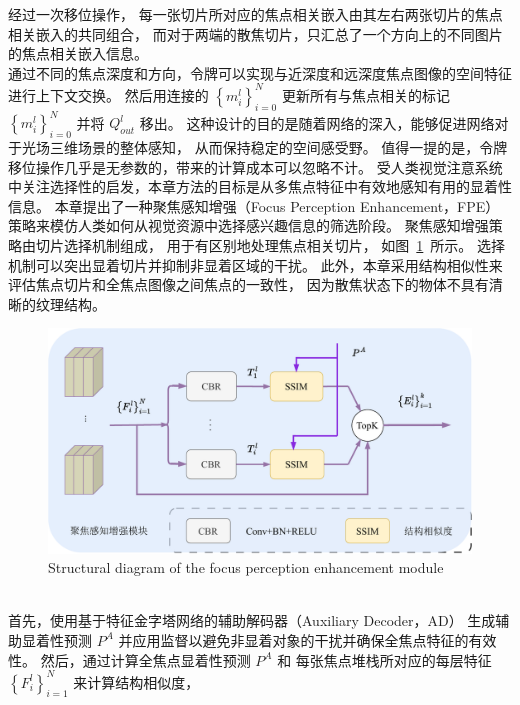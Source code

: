 经过一次移位操作，
每一张切片所对应的焦点相关嵌入由其左右两张切片的焦点相关嵌入的共同组合，
而对于两端的散焦切片，只汇总了一个方向上的不同图片的焦点相关嵌入信息。
\\
%
%
%
%
\indent
通过不同的焦点深度和方向，令牌可以实现与近深度和远深度焦点图像的空间特征进行上下文交换。 
然后用连接的 $ \left \{ m_{i}^{l} \right \}_{i=0}^{N} $ 更新所有与焦点相关的标记  $ \left \{ m_{i}^{l} \right \}_{i=0}^{N} $ 并将 
$ Q_{out}^{l} $ 移出。 
这种设计的目的是随着网络的深入，能够促进网络对于光场三维场景的整体感知，
从而保持稳定的空间感受野。 
值得一提的是，令牌移位操作几乎是无参数的，带来的计算成本可以忽略不计。
%
%
%
%
受人类视觉注意系统中关注选择性的启发，本章方法的目标是从多焦点特征中有效地感知有用的显着性信息。 
本章提出了一种聚焦感知增强（Focus Perception Enhancement，FPE）策略来模仿人类如何从视觉资源中选择感兴趣信息的筛选阶段。 
聚焦感知增强策略由切片选择机制组成，
用于有区别地处理焦点相关切片，
如图~\ref{cpt3_fig1:fpe}~所示。
选择机制可以突出显着切片并抑制非显着区域的干扰。 
此外，本章采用结构相似性来评估焦点切片和全焦点图像之间焦点的一致性，
因为散焦状态下的物体不具有清晰的纹理结构。 
%
%
\begin{figure}[!ht]
	\centering
	\includegraphics[width=0.90\linewidth]{figures/chapter3/fpe}
	{Structural diagram of the focus perception enhancement module}
	\label{cpt3_fig1:fpe}
\end{figure}
%
%
\\
%
%
%
%
\indent
首先，使用基于特征金字塔网络的辅助解码器（Auxiliary Decoder，AD）
生成辅助显着性预测 $ P^{A} $ 并应用监督以避免非显着对象的干扰并确保全焦点特征的有效性。 
然后，通过计算全焦点显着性预测 $ P^{A} $ 和
每张焦点堆栈所对应的每层特征
$ \left \{ F_{i}^{l} \right \}_{i=1}^{N} $
来计算结构相似度，
